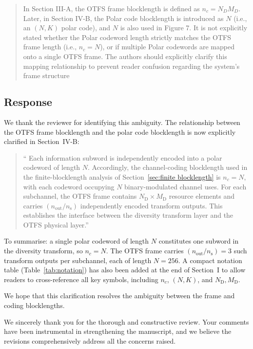 \begin{mdframed}
\begin{quote}
In Section III-A, the OTFS frame blocklength is defined as $n_c = N_D M_D$. Later, in Section IV-B, the Polar code blocklength is introduced as $N$ (i.e., an $(N, K)$ polar code), and $N$ is also used in Figure 7. It is not explicitly stated whether the Polar codeword length strictly matches the OTFS frame length (i.e., $n_c = N$), or if multiple Polar codewords are mapped onto a single OTFS frame. The authors should explicitly clarify this mapping relationship to prevent reader confusion regarding the system's frame structure
\end{quote}

\end{mdframed}


\subsection{Response}

We thank the reviewer for identifying this ambiguity. The relationship between the OTFS frame blocklength and the polar code blocklength is now explicitly clarified in Section~IV-B:

\begin{quote}
``{\color{blue} Each information subword is independently encoded into a polar codeword of length $N$. Accordingly, the channel-coding blocklength used in the finite-blocklength analysis of Section~\ref{sec:finite blocklength} is $n_c = N$, with each codeword occupying $N$ binary-modulated channel uses. For each subchannel, the OTFS frame contains $N_{\mathrm{D}} \times M_{\mathrm{D}}$ resource elements and carries $(n_{\mathrm{out}}/n_{\mathrm{s}})$ independently encoded transform outputs. This establishes the
interface between the diversity transform layer and the OTFS physical layer.}''
\end{quote}

To summarise: a single polar codeword of length $N$ constitutes one subword in the diversity transform, so $n_c = N$. The OTFS frame carries $(n_{\mathrm{out}}/n_{\mathrm{s}}) = 3$ such transform outputs per subchannel, each of length $N = 256$. A compact notation table (Table~\ref{tab:notation}) has also been added at the end of Section~I to allow readers to cross-reference all key symbols, including $n_c$, $(N,K)$, and $N_{\mathrm{D}}, M_{\mathrm{D}}$.

We hope that this clarification resolves the ambiguity between the frame and coding blocklengths.

\vskip 0.2in
We sincerely thank you for the thorough and constructive review. Your comments have been instrumental in strengthening the manuscript, and we believe the revisions comprehensively address all the concerns raised.
